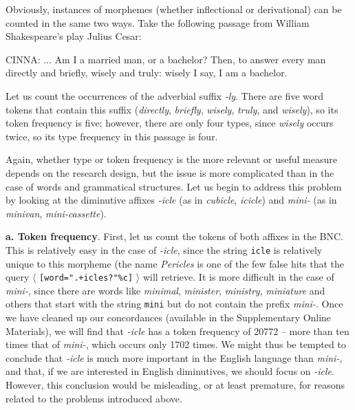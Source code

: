 Obviously, instances of morphemes (whether inflectional or derivational) can be counted in the same two ways. Take the following passage from William Shakespeare's play Julius Cesar:

\begin{exe}
\ex CINNA: ... Am I a married man, or a bachelor? Then, to answer every man directly and briefly, wisely and truly: wisely I say, I am a bachelor.
\label{ex:shakspearecinna}
\end{exe}

Let us count the occurrences of the adverbial suffix \textit{-ly}. There are five word tokens that contain this suffix (\textit{directly}, \textit{briefly}, \textit{wisely}, \textit{truly}, and \textit{wisely}), so its token frequency is five; however, there are only four types, since \textit{wisely} occurs twice, so its type frequency in this passage is four.

Again, whether type or token frequency is the more relevant or useful measure depends on the research design, but the issue is more complicated than in the case of words and grammatical structures. Let us begin to address this problem by looking at the diminutive affixes \textit{-icle} (as in \textit{cubicle}, \textit{icicle}) and \textit{mini-} (as in \textit{minivan}, \textit{mini-cassette}).

\textbf{a. Token frequency}. First, let us count the tokens of both affixes in the BNC. This is relatively easy in the case of \textit{-icle}, since the string \texttt{icle} is relatively unique to this morpheme (the name \textit{Pericles} is one of the few false hits that the query $\langle$ \texttt{[word=".+icles?"\%c]} $\rangle$ will retrieve. It is more difficult in the case of \textit{mini-}, since there are words like \textit{minimal}, \textit{minister}, \textit{ministry}, \textit{miniature} and others that start with the string \texttt{mini} but do not contain the prefix \textit{mini-}. Once we have cleaned up our concordances (available in the Supplementary Online Materials), we will find that \textit{-icle} has a token frequency of \num{20772} -- more than ten times that of \textit{mini-}, which occurs only \num{1702} times. We might thus be tempted to conclude that \textit{-icle} is much more important in the English language than \textit{mini-}, and that, if we are interested in English diminutives, we should focus on \textit{-icle}. However, this conclusion would be misleading, or at least premature, for reasons related to the problems introduced above.

